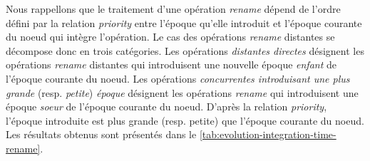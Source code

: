 \documentclass[12pt]{thesul}
\begin{document}
Nous rappellons que le traitement d'une opération \emph{rename} dépend de l'ordre défini par la relation \emph{priority} entre l'époque qu'elle introduit et l'époque courante du noeud qui intègre l'opération.
Le cas des opérations \emph{rename} distantes se décompose donc en trois catégories.
Les opérations \emph{distantes directes} désignent les opérations \emph{rename} distantes qui introduisent une nouvelle époque \emph{enfant} de l'époque courante du noeud.
Les opérations \emph{concurrentes introduisant une plus grande} (resp. \emph{petite}) \emph{époque} désignent les opérations \emph{rename} qui introduisent une époque \emph{soeur} de l'époque courante du noeud.
D'après la relation \emph{priority}, l'époque introduite est plus grande (resp. petite) que l'époque courante du noeud.
Les résultats obtenus sont présentés dans le \autoref{tab:evolution-integration-time-rename}.
\end{document}
